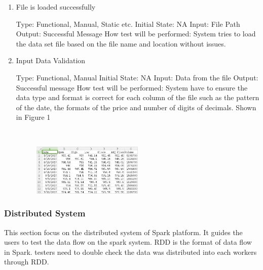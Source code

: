 \documentclass[12pt, titlepage]{article}
\begin{document}
\begin{enumerate}

\item{File is loaded successfully\\}

Type: Functional, Manual, Static etc.
Initial State: NA
Input: File Path
Output: Successful Message
How test will be performed: System tries to load the data set file based on the file name and location without issues.
\item{Input Data Validation\\}

Type: Functional, Manual
Initial State: NA
Input: Data from the file
Output: Successful message
How test will be performed: System have to ensure the data type and format is
correct for each column of the file such as the pattern of the date, the formats
of the price and number of digits of decimals. Shown in Figure 1    


  ~\newline
\begin{figure}[h!]
\begin{center}
{
\includegraphics[width=0.5\textwidth]{amazon.png}
}
\caption{\label{Input Data}}
\end{center}
\end{figure}

\end{enumerate}

\subsubsection{Distributed System}
This section focus on the distributed system of Spark platform. It guides the
users to test the data flow on the spark system. RDD is the format of data flow
in Spark. testers need to double check the data was distributed into each
workers through RDD.
\end{document}
